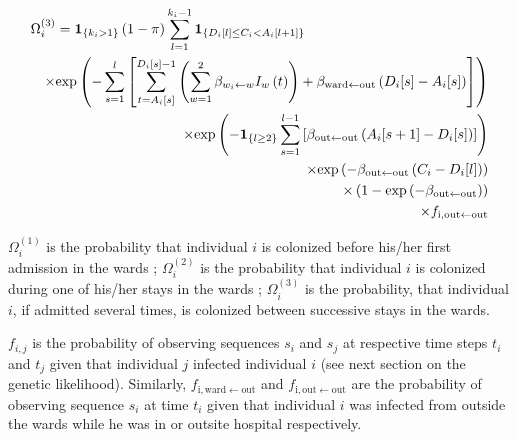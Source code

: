 \documentclass[10pt]{article}
\begin{document}
\begin{eqnarray*}
\lefteqn{\Omega_i^{\left(3\right)}  = \mathbf{1}_{\left\lbrace k_i > 1 \right\rbrace} \left( 1-\pi \right) \sum_{l=1}^{k_i-1} \mathbf{1}_{\left\lbrace D_i[l] \leq C_i < A_i[l+1] \right\rbrace}}\\
	 && \times \text{exp}\left( - \sum_{s=1}^{l} \left[ \sum_{t=A_i[s]}^{D_i[s]-1} \left( \sum_{w=1}^{2} \beta_{w_i \leftarrow w} I_w\left(t\right) \right) + \beta_{\text{ward} \leftarrow \text{out}}\left(D_i[s]-A_i[s]\right) \right] \right) \\
	 && \times \text{exp}\left( - \mathbf{1}_{\left\lbrace l \geq 2 \right\rbrace} \sum_{s=1}^{l-1} \left[ \beta_{\text{out} \leftarrow \text{out}}\left(A_i[s+1]-D_i[s]\right) \right] \right) \\
	 && \times \text{exp}\left( - \beta_{\text{out} \leftarrow \text{out}}\left(C_i-D_i[l]\right) \right) \\
	 && \times \left( 1 - \text{exp}\left( - \beta_{\text{out} \leftarrow \text{out}} \right) \right) \\
	 && \times f_{\text{i},\text{out} \leftarrow \text{out}}  \\
\end{eqnarray*}
\bigskip

$\Omega_i^{\left(1\right)}$ is the probability that individual $i$ is colonized before his/her first admission in the wards ; $\Omega_i^{\left(2\right)}$ is the probability that individual $i$ is colonized during one of his/her stays in the wards ; $\Omega_i^{\left(3\right)}$ is the probability, that individual $i$, if admitted several times, is colonized between successive stays in the wards.

$f_{i,j}$ is the probability of observing sequences $s_i$ and $s_j$ at respective time steps $t_i$ and $t_j$ given that individual $j$ infected individual $i$ (see next section on the genetic likelihood). Similarly, $f_{\text{i},\text{ward} \leftarrow \text{out}}$ and $f_{\text{i},\text{out} \leftarrow \text{out}}$ are the probability of observing sequence $s_i$ at time $t_i$ given that individual $i$ was infected from outside the wards while he was in or outsite hospital respectively. 
\end{document}
